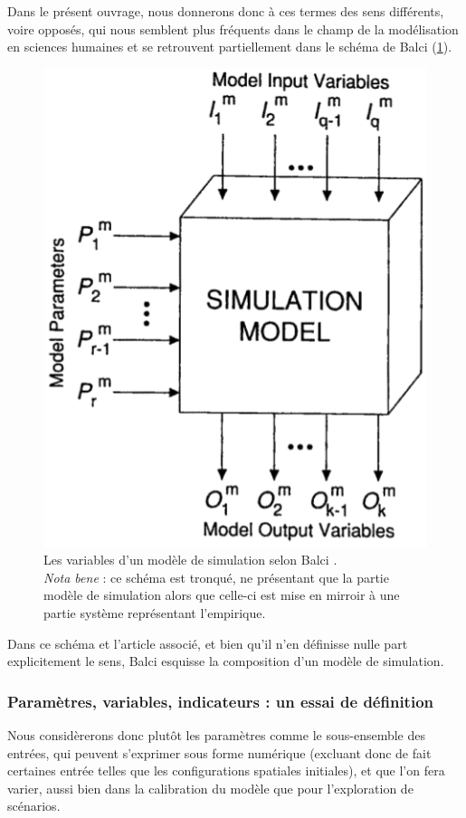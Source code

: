 Dans le présent ouvrage, nous donnerons donc à ces termes des sens différents, voire opposés, qui nous semblent plus fréquents dans le champ de la modélisation en sciences humaines et se retrouvent partiellement dans le schéma de Balci (\cref{fig:parametres-Balci}).
\begin{figure}[!h]
	\includegraphics[width=.4\linewidth]{img/Balci1994a_Figure_Parametres.png}
	\caption{Les variables d'un modèle de simulation selon Balci \autocite[122]{balci_validation_1994}.\\
		\textit{Nota bene} : ce schéma est tronqué, ne présentant que la partie \og modèle de simulation\fg{} alors que celle-ci est mise en mirroir à une partie \og système\fg{} représentant l'empirique.}
	\label{fig:parametres-Balci} 
\end{figure}

Dans ce schéma et l'article associé, et bien qu'il n'en définisse nulle part explicitement le sens, Balci esquisse la composition d'un modèle de simulation.



\subsubsection{Paramètres, variables, indicateurs : un essai de définition}
\label{subsubsec:mes_definitions_params}

Nous considèrerons donc plutôt les paramètres comme le sous-ensemble des entrées, qui peuvent s'exprimer sous forme numérique (excluant donc de fait certaines entrée telles que les configurations spatiales initiales), et que l'on fera varier, aussi bien dans la calibration du modèle que pour l'exploration de scénarios.





